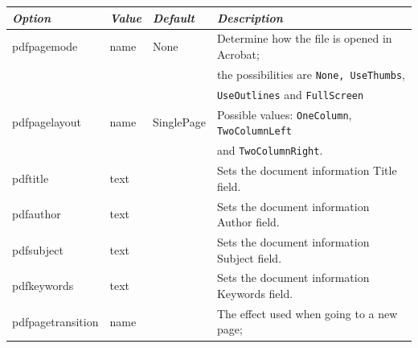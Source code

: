 \documentclass[landscape, headrule, footrule]{foils}
\begin{document}
{\small
\begin{tabular}{llll}
\hline
\textit{Option}&\textit{Value}&\textit{Default}&\textit{Description}\\
\hline
pdfpagemode &name&None&Determine how the file is opened in Acrobat;\\
            &     &   &the possibilities are \texttt{None, UseThumbs},\\
            &     &   &\texttt{UseOutlines} and \texttt{FullScreen}\\
{pdfpagelayout} & name &SinglePage& Possible values: \texttt{OneColumn},
\texttt{TwoColumnLeft}\\
            &     &    & and \texttt{TwoColumnRight}.\\
\hline
pdftitle &text& &Sets the document information Title field.\\
pdfauthor &text& &Sets the document information Author field.\\
pdfsubject &text& &Sets the document information Subject field.\\
pdfkeywords &text& &Sets the document information Keywords field.\\
\hline
{\tiny pdfpagetransition} &name& &The effect used when going to a new page;\\
\hline
\end{tabular}
}
\end{document}
